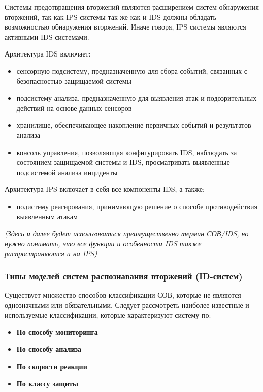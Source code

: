 Системы предотвращения вторжений являются расширением систем обнаружения вторжений, так как IPS системы так же как и IDS должны обладать возможностью обнаружения вторжений. Иначе говоря, IPS системы являются активными IDS системами.

Архитектура IDS включает:
\begin{itemize}
	\item сенсорную подсистему, предназначенную для сбора событий, связанных с безопасностью защищаемой системы
	
	\item подсистему анализа, предназначенную для выявления атак и подозрительных действий на основе данных сенсоров
	
	\item хранилище, обеспечивающее накопление первичных событий и результатов анализа
	
	\item консоль управления, позволяющая конфигурировать IDS, наблюдать за состоянием защищаемой системы и IDS, просматривать выявленные подсистемой анализа инциденты
\end{itemize}

Архитектура IPS включает в себя все компоненты IDS, а также:
\begin{itemize}
	\item подистему реагирования, принимающую решение о способе противодействия выявленным атакам
\end{itemize}

\textit{(Здесь и далее будет использоваться преимущественно термин СОВ/IDS, но нужно понимать, что все функции и особенности IDS также распространяются и на IPS)}

\subsubsection{Типы моделей систем распознавания вторжений (ID-систем)}

Существует множество способов классификации СОВ, которые не являются однозначными или
обязательными. Следует рассмотреть наиболее известные и используемые классификации,
которые характеризуют систему по:
\begin{itemize}
	\item \textbf{По способу мониторинга}

	\item \textbf{По способу анализа}

	\item \textbf{По скорости реакции}

	\item \textbf{По классу защиты}
\end{itemize}

